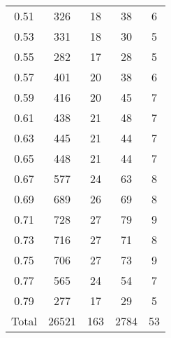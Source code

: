 \begin{table}[h!]
\begin{minipage}{\textwidth}
\begin{center}
\begin{tabular}{c|c|c|c|c}
0.51  & 326  & 18  & 38  & 6\\
0.53  & 331  & 18  & 30  & 5\\
0.55  & 282  & 17  & 28  & 5\\
0.57  & 401  & 20  & 38  & 6\\
0.59  & 416  & 20  & 45  & 7\\
0.61  & 438  & 21  & 48  & 7\\
0.63  & 445  & 21  & 44  & 7\\
0.65  & 448  & 21  & 44  & 7\\
0.67  & 577  & 24  & 63  & 8\\
0.69  & 689  & 26  & 69  & 8\\
0.71  & 728  & 27  & 79  & 9\\
0.73  & 716  & 27  & 71  & 8\\
0.75  & 706  & 27  & 73  & 9\\
0.77  & 565  & 24  & 54  & 7\\
0.79  & 277  & 17  & 29  & 5\\
\hline
Total  & 26521  & 163 & 2784 & 53 \\
\hline \hline
\end{tabular}


\end{center}
\end{minipage}
\end{table}